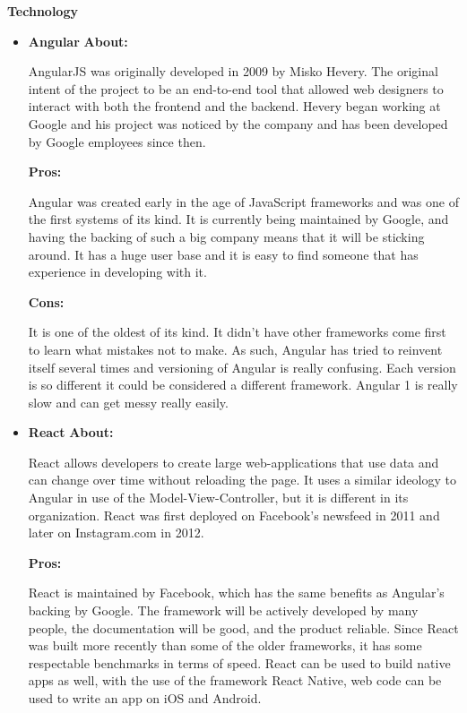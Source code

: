 \documentclass[draftclsnofoot,onecolumn,letterpaper,10pt]{IEEEtran}
\begin{document}
	\textbf{Technology}
		\begin{itemize}
			\item{\textbf{Angular}}
				\textbf{About:}

				AngularJS was originally developed in 2009 by Misko Hevery\cite{AngularIntroduction}.
				The original intent of the project to be an end-to-end tool that allowed web designers to interact with both the frontend and the backend.\cite{HistoryOfAngular}
				Hevery began working at Google and his project was noticed by the company and has been developed by Google employees since then.

				\noindent \textbf{Pros:}

				Angular was created early in the age of JavaScript frameworks and was one of the first systems of its kind.
				It is currently being maintained by Google, and having the backing of such a big company means that it will be sticking around.
				It has a huge user base and it is easy to find someone that has experience in developing with it.

				\noindent \textbf{Cons:}

				It is one of the oldest of its kind.
				It didn't have other frameworks come first to learn what mistakes not to make.
				As such, Angular has tried to reinvent itself several times and versioning of Angular is really confusing. Each version is so different it could be considered a different framework.
				Angular 1 is really slow\cite{SpeedReport} and can get messy really easily.

			\item{\textbf{React}}
				\textbf{About:}

				React allows developers to create large web-applications that use data and can change over time without reloading the page.
				It uses a similar ideology to Angular in use of the Model-View-Controller, but it is different in its organization.
				React was first deployed on Facebook's newsfeed in 2011 and later on Instagram.com in 2012.

				\noindent \textbf{Pros:}

				React is maintained by Facebook, which has the same benefits as Angular's backing by Google.
				The framework will be actively developed by many people, the documentation will be good, and the product reliable.
				Since React was built more recently than some of the older frameworks, it has some respectable benchmarks in terms of speed.\cite{SpeedReport}
				React can be used to build native apps as well, with the use of the framework React Native, web code can be used to write an app on iOS and Android.


\end{itemize}
\end{document}
